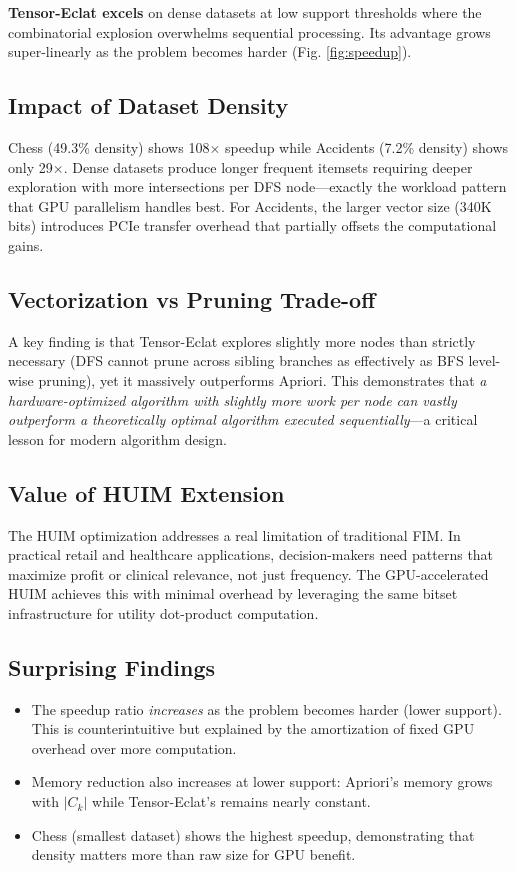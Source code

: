 \documentclass[conference]{IEEEtran}
\begin{document}
\textbf{Tensor-Eclat excels} on dense datasets at low support thresholds where the combinatorial explosion overwhelms sequential processing. Its advantage grows super-linearly as the problem becomes harder (Fig. \ref{fig:speedup}).

\subsection{Impact of Dataset Density}
Chess (49.3\% density) shows 108$\times$ speedup while Accidents (7.2\% density) shows only 29$\times$. Dense datasets produce longer frequent itemsets requiring deeper exploration with more intersections per DFS node---exactly the workload pattern that GPU parallelism handles best. For Accidents, the larger vector size (340K bits) introduces PCIe transfer overhead that partially offsets the computational gains.

\subsection{Vectorization vs Pruning Trade-off}
A key finding is that Tensor-Eclat explores slightly more nodes than strictly necessary (DFS cannot prune across sibling branches as effectively as BFS level-wise pruning), yet it massively outperforms Apriori. This demonstrates that \textit{a hardware-optimized algorithm with slightly more work per node can vastly outperform a theoretically optimal algorithm executed sequentially}---a critical lesson for modern algorithm design.

\subsection{Value of HUIM Extension}
The HUIM optimization addresses a real limitation of traditional FIM. In practical retail and healthcare applications, decision-makers need patterns that maximize profit or clinical relevance, not just frequency. The GPU-accelerated HUIM achieves this with minimal overhead by leveraging the same bitset infrastructure for utility dot-product computation.

\subsection{Surprising Findings}
\begin{itemize}
    \item The speedup ratio \textit{increases} as the problem becomes harder (lower support). This is counterintuitive but explained by the amortization of fixed GPU overhead over more computation.
    \item Memory reduction also increases at lower support: Apriori's memory grows with $|C_k|$ while Tensor-Eclat's remains nearly constant.
    \item Chess (smallest dataset) shows the highest speedup, demonstrating that density matters more than raw size for GPU benefit.
\end{itemize}
\end{document}
